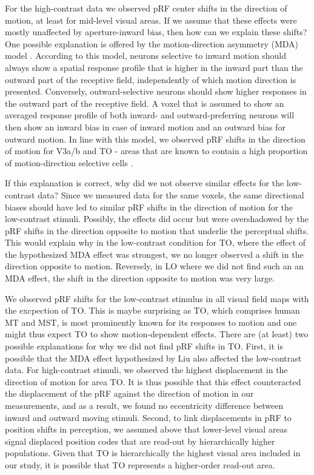 For the high-contrast data we observed pRF center shifts in the direction of motion, at least for mid-level visual areas. If we assume that these effects were mostly unaffected by aperture-inward bias, then how can we explain these shifts? One possible explanation is offered by the motion-direction asymmetry (MDA) model \parencite{Liu2006}. According to this model, neurons selective to inward motion should always show a spatial response profile that is higher in the inward part than the outward part of the receptive field, independently of which motion direction is presented. Conversely, outward-selective neurons should show higher responses in the outward part of the receptive field. A voxel that is assumed to show an averaged response profile of both inward- and outward-preferring neurons will then show an inward bias in case of inward motion and an outward bias for outward motion. In line with this model, we observed pRF shifts in the direction of motion for V3a/b and TO - areas that are known to contain a high proportion of motion-direction selective cells \parencite{Dubner1971, Born2005}.

If this explanation is correct, why did we not observe similar effects for the low-contrast data? Since we measured data for the same voxels, the same directional biases should have led to similar pRF shifts in the direction of motion for the low-contrast stimuli. Possibly, the effects did occur but were overshadowed by the pRF shifts in the direction opposite to motion that underlie the perceptual shifts. This would explain why in the low-contrast condition for TO, where the effect of the hypothesized MDA effect was strongest, we no longer observed a shift in the direction opposite to motion. Reversely, in LO where we did not find such an an MDA effect, the shift in the direction opposite to motion was very large.

We observed pRF shifts for the low-contrast stimulus in all visual field maps with the excpection of TO. This is maybe surprising as TO, which comprises human MT and MST, is most prominently known for its responses to motion and one might thus expect TO to show motion-dependent effects. There are (at least) two possible explanations for why we did not find pRF shifts in TO. First, it is possible that the MDA effect hypothesized by Liu \parencite*{Liu2006} also affected the low-contrast data. For high-contrast stimuli, we observed the highest displacement in the direction of motion for area TO. It is thus possible that this effect counteracted the displacement of the pRF against the direction of motion in our measurements, and as a result, we found no eccentricity difference between inward and outward moving stimuli. Second, to link displacements in pRF to position shifts in perception, we assumed above that lower-level visual areas signal displaced position codes that are read-out by hierarchically higher populations. Given that TO is hierarchically the highest visual area included in our study, it is possible that TO represents a higher-order read-out area.

